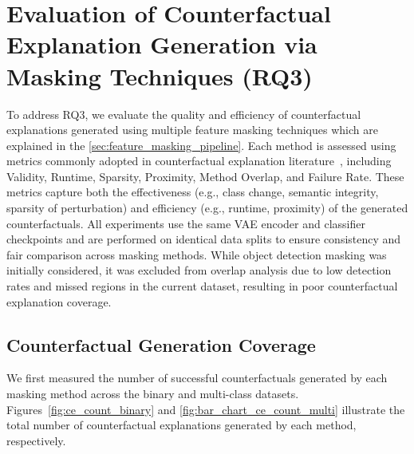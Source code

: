 


\clearpage

\section{Evaluation of Counterfactual Explanation Generation via Masking Techniques (RQ3)} \label{sec:masking_eval}
To address RQ3, we evaluate the quality and efficiency of counterfactual explanations generated using multiple feature masking techniques which are explained in the \cref{sec:feature_masking_pipeline}. Each method is assessed using metrics commonly adopted in counterfactual explanation literature~\cite{DELANEY2023103995, chan2022comparativestudyfaithfulnessmetrics, Singh1622975, MARKUS2021103655, DBLP:journals/corr/abs-1905-07697}, including Validity, Runtime, Sparsity, Proximity, Method Overlap, and Failure Rate. These metrics capture both the effectiveness (e.g., class change, semantic integrity, sparsity of perturbation) and efficiency (e.g., runtime, proximity) of the generated counterfactuals.
All experiments use the same VAE encoder and classifier checkpoints and are performed on identical data splits to ensure consistency and fair comparison across masking methods.
While object detection masking was initially considered, it was excluded from overlap analysis due to low detection rates and missed regions in the current dataset, resulting in poor counterfactual explanation coverage.

\subsection{Counterfactual Generation Coverage}
We first measured the number of successful counterfactuals generated by each masking method across the binary and multi-class datasets. Figures~\ref{fig:ce_count_binary} and \ref{fig:bar_chart_ce_count_multi} illustrate the total number of counterfactual explanations generated by each method, respectively.

